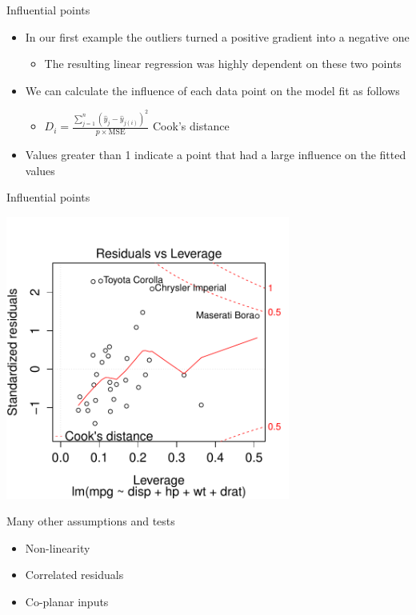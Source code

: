 \begin{frame}{Influential points}
  \begin{itemize}
    \item In our first example the outliers turned a positive gradient into a negative one
    \begin{itemize}
      \item The resulting linear regression was highly dependent on these two points
    \end{itemize}
    \pause
    \vspace{\baselineskip}
    \item We can calculate the influence of each data point on the model fit as follows
    \begin{itemize}
      \item $D_i = \frac{\sum_{j=1}^n (\hat{y}_j - \hat{y}_{j(i)})^2}{p \times \textrm{MSE}}$ \ie Cook's distance
    \end{itemize}
    \pause
    \vspace{\baselineskip}
    \item Values greater than 1 indicate a point that had a large influence on the fitted values
  \end{itemize}
\end{frame}

\begin{frame}{Influential points}
  \begin{center}
    \includegraphics[width=0.7\textwidth]{figures/cooks.pdf}
  \end{center}
\end{frame}

\begin{frame}{Many other assumptions and tests}
  \begin{itemize}
    \item Non-linearity
    \vspace{\baselineskip}
    \item Correlated residuals
    \vspace{\baselineskip}
    \item Co-planar inputs
    \vspace{\baselineskip}
  \end{itemize}
\end{frame}

